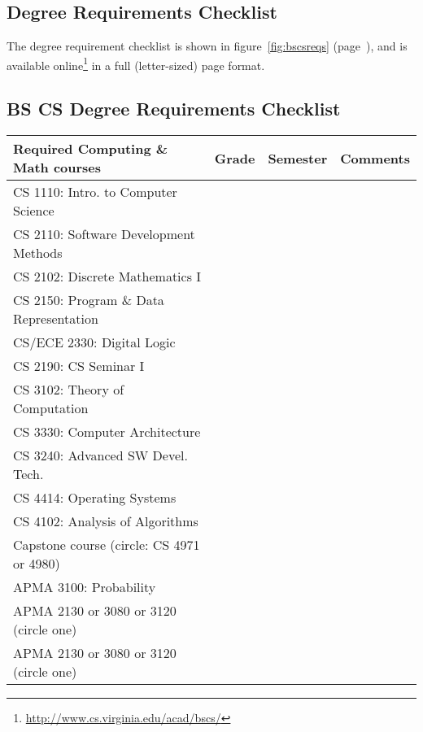 \documentclass[10pt,letter,twocolumn]{book}
\newcommand{\myurl}[1]{\footnote{\scriptsize\url{#1}}}
\begin{document}
\subsection{Degree Requirements Checklist}

The degree requirement checklist is shown in figure~\ref{fig:bscsreqs}
(page~\pageref{fig:bscsreqs}), and is available
online\myurl{http://www.cs.virginia.edu/acad/bscs/} in a full
(letter-sized) page format.

\begin{figure*}
\subsection*{BS CS Degree Requirements Checklist}
\label{fig:bscsreqs}
\begin{center}
\begin{tabular}{|l|l|l|l|} \hline
\bf Required Computing \& Math courses & \bf Grade & \bf Semester &
\bf Comments \\ \hline \hline
CS 1110: Intro. to Computer Science & & & \\ \hline
CS 2110: Software Development Methods & & & \\ \hline
CS 2102: Discrete Mathematics I & & & \\ \hline
CS 2150: Program \& Data Representation & & & \\ \hline
CS/ECE 2330: Digital Logic & & & \\ \hline
CS 2190: CS Seminar I & & & \\ \hline
CS 3102: Theory of Computation & & & \\ \hline
CS 3330: Computer Architecture & & & \\ \hline
CS 3240: Advanced SW Devel. Tech. & & & \\ \hline
CS 4414: Operating Systems & & & \\ \hline
CS 4102: Analysis of Algorithms & & & \\ \hline
Capstone course (circle: CS 4971 or 4980) & & & \\ \hline
APMA 3100: Probability & & & \\ \hline
APMA 2130 or 3080 or 3120 (circle one) & & & \\ \hline
APMA 2130 or 3080 or 3120 (circle one) & & & \\ \hline
\end{tabular}


\end{center}
\end{figure*}
\end{document}
